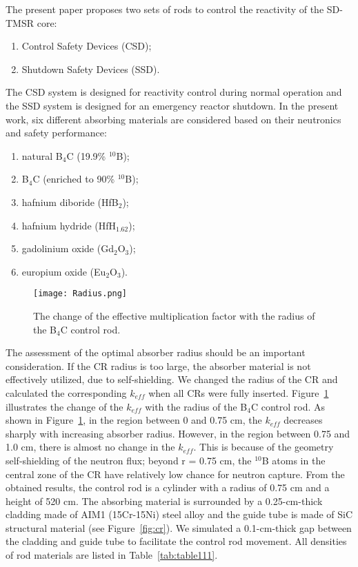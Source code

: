 The present paper proposes two sets of rods to control the reactivity of the SD-TMSR core:
\begin{enumerate}
\item Control Safety Devices (CSD);
\item Shutdown Safety Devices (SSD).
\end{enumerate}
The CSD system is designed for reactivity control during normal operation and the SSD system is designed for an emergency reactor shutdown.
In the present work, six different absorbing materials are considered based on their neutronics and safety performance:
\begin{enumerate}
\item natural B$_4$C (19.9\% $^{10}$B);
\item B$_4$C (enriched to 90\% $^{10}$B);
\item hafnium diboride (HfB$_2$);
\item hafnium hydride (HfH$_{1.62}$);
\item gadolinium oxide (Gd$_2$O$_3$);
\item europium oxide (Eu$_2$O$_3$).
\end{enumerate}

\begin{figure}[t!]  %
	\centering
	\hspace{+0.65in} 
	\texttt{[image: Radius.png]}
	\caption{The change of the effective multiplication factor with the radius of the B$_4$C control rod.}
	\label{fig:Radius}
\end{figure}

The assessment of the optimal absorber radius should be an important consideration. If the CR radius is too large, the absorber material is not effectively utilized, due to self-shielding. We changed the radius of the CR and calculated the corresponding $k_{eff}$ when all CRs were fully inserted. Figure~\ref{fig:Radius} illustrates the change of the $k_{eff}$ with the radius of the B$_4$C control rod. As shown in Figure~\ref{fig:Radius}, in the region between 0 and 0.75 cm, the $k_{eff}$ decreases sharply with increasing absorber radius. However, in the region between 0.75 and 1.0 cm, there is almost no change in the $k_{eff}$. This is because of the geometry self-shielding of the neutron flux; beyond r = 0.75 cm, the $^{10}$B atoms in the central zone of the CR have relatively low chance for neutron capture.
From the obtained results, the control rod is a cylinder with a radius of 0.75 cm and a height of 520 cm. 
The absorbing material is surrounded by a 0.25-cm-thick cladding made of AIM1 
(15Cr-15Ni) steel alloy \cite{SERAN2017285} and the guide tube is made of 
SiC structural material (see Figure~\ref{fig:cr}). We simulated a 0.1-cm-thick gap between the 
cladding and guide tube to facilitate the control rod movement.
All densities of rod materials are listed in
Table~\ref{tab:table111}.


